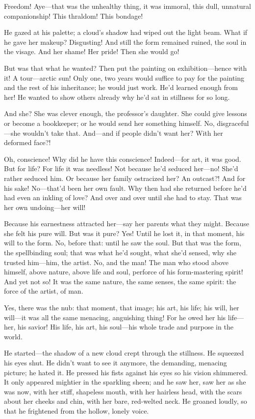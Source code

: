\documentclass[12pt,a4paper]{article}
\begin{document}
Freedom! Aye—that was the unhealthy thing, it was immoral, this dull, unnatural companionship! This thraldom! This bondage!

He gazed at his palette; a cloud’s shadow had wiped out the light beam. What if he gave her makeup? Disgusting! And still the form remained ruined, the soul in the visage. And her shame! Her pride! Then she would go!

But was that what he wanted? Then put the painting on exhibition—hence with it! A tour—arctic sun! Only one, two years would suffice to pay for the painting and the rest of his inheritance; he would just work. He’d learned enough from her! He wanted to show others already why he’d sat in stillness for so long.

And she? She was clever enough, the professor’s daughter. She could give lessons or become a bookkeeper; or he would send her something himself. No, disgraceful—she wouldn’t take that. And—and if people didn’t want her? With her deformed face?!

Oh, conscience! Why did he have this conscience! Indeed—for art, it was good. But for life? For life it was needless! Not because he’d seduced her—no! She’d rather seduced him. Or because her family ostracized her? An outcast?! And for his sake! No—that’d been her own fault. Why then had she returned before he’d had even an inkling of love? And over and over until she had to stay. That was her own undoing—her will!

Because his earnestness attracted her—say her parents what they might. Because she felt his pure will. But was it pure? Yes! Until he lost it, in that moment, his will to the form. No, before that: until he saw the soul. But that was the form, the spellbinding soul; that was what he’d sought, what she’d sensed, why she trusted him—him, the artist. No, and the man! The man who stood above himself, above nature, above life and soul, perforce of his form-mastering spirit! And yet not so! It was the same nature, the same senses, the same spirit: the force of the artist, of man.

Yes, there was the nub: that moment, that image; his art, his life; his will, her will—it was all the same menacing, anguishing thing! For he owed her his life—her, his savior! His life, his art, his soul—his whole trade and purpose in the world.

He started—the shadow of a new cloud crept through the stillness. He squeezed his eyes shut. He didn’t want to see it anymore, the demanding, menacing picture; he hated it. He pressed his fists against his eyes so his vision shimmered. It only appeared mightier in the sparkling sheen; and he saw her, saw her as she was now, with her stiff, shapeless mouth, with her hairless head, with the scars about her cheeks and chin, with her bare, red-welted neck. He groaned loudly, so that he frightened from the hollow, lonely voice.
\end{document}
